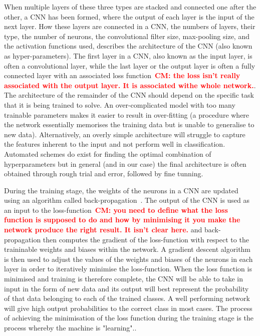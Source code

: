\documentclass[aps,twocolumn,showpacs,groupedaddress, nofootinbib]{revtex4}  %
\newcommand{\cm}[1]{\textbf{\textcolor{red}{CM: #1}}}
\begin{document}
%
%
When multiple layers of these three types are stacked and connected one after
the other, a \ac{CNN} has been formed, where the output of each layer is the
input of the next layer. How these layers are connected in a \ac{CNN}, the
numbers of layers, their type, the number of neurons, the convolutional filter
size, max-pooling size, and the activation functions used, describes the
architecture of the \ac{CNN} (also known as hyper-parameters). The first layer
in a \ac{CNN}, also known as the input layer, is often a convolutional layer,
while the last layer or the output layer is often a fully connected layer with
an associated loss function~\cm{the loss isn't really associated with the
output layer. It is associated withe whole network.}. The architecture of the
remainder of the \ac{CNN} should depend on the specific task that it is being
trained to solve. An over-complicated model with too many trainable parameters
makes it easier to result in over-fitting (a procedure where the network
essentially memorises the training data but is unable to generalise to new
data). Alternatively, an overly simple architecture will struggle to capture
the features inherent to the input and not perform well in classification.
Automated schemes do exist for finding the optimal combination of
hyperparameters but in general (and in our case) the final architecture is
often obtained through rough trial and error, followed by fine tunning.

%
%
During the training stage, the weights of the neurons in a \ac{CNN} are updated
using an algorithm called back-propagation~\cite{lecun1988theoretical}. The
output of the \ac{CNN} is used as an input to the loss-function~\cm{you need to
define what the loss function is supposed to do and how by minimising it you
make the network produce the right result. It isn't clear here.} and
back-propagation then computes the gradient of the loss-function with respect
to the traininable weights and biases within the network. A gradient descent
algorithm is then used to adjust the values of the weights and biases of the
neurons in each layer in order to iteratively minimise the loss-function.  When
the loss function is minimised and training is therefore complete, the \ac{CNN}
will be able to take in input in the form of new data and its output will best
represent the probability of that data belonging to each of the trained
classes. A well performing network will give high output probabilities to the
correct class in most cases. The process of achieving the minimisation of the
loss function during the training stage is the process whereby the machine is
"learning"..
\end{document}
